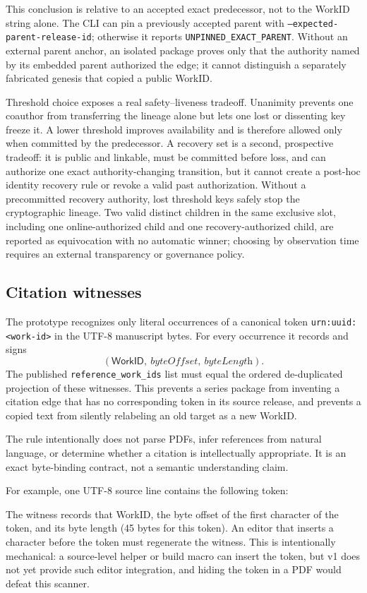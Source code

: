 \documentclass[acmsmall,screen,review,nonacm]{acmart}
\newcommand{\workid}{\textsf{WorkID}}
\begin{document}
This conclusion is relative to an accepted exact predecessor, not to the
WorkID string alone. The CLI can pin a previously accepted parent with
\texttt{--expected-parent-release-id}; otherwise it reports
\texttt{UNPINNED\_EXACT\_PARENT}. Without an external parent anchor, an isolated
package proves only that the authority named by its embedded parent authorized
the edge; it cannot distinguish a separately fabricated genesis that copied a
public WorkID.

Threshold choice exposes a real safety--liveness tradeoff. Unanimity prevents
one coauthor from transferring the lineage alone but lets one lost or dissenting
key freeze it. A lower threshold improves availability and is therefore allowed
only when committed by the predecessor. A recovery set is a second, prospective
tradeoff: it is public and linkable, must be committed before loss, and can
authorize one exact authority-changing transition, but it cannot create a
post-hoc identity recovery rule or revoke a valid past authorization. Without a
precommitted recovery authority, lost threshold keys safely stop the
cryptographic lineage. Two valid distinct children in the same exclusive slot,
including one online-authorized child and one recovery-authorized child, are
reported as equivocation with no automatic winner; choosing by observation time
requires an external transparency or governance policy.

\subsection{Citation witnesses}

The prototype recognizes only literal occurrences of a canonical token \texttt{urn:uuid:<work-id>} in the UTF-8 manuscript bytes. For every occurrence it records and signs
\[
  (\workid,\ \textit{byteOffset},\ \textit{byteLength}).
\]
The published \texttt{reference\_work\_ids} list must equal the ordered de-duplicated projection of these witnesses. This prevents a series package from inventing a citation edge that has no corresponding token in its source release, and prevents a copied text from silently relabeling an old target as a new \workid.

The rule intentionally does not parse PDFs, infer references from natural language, or determine whether a citation is intellectually appropriate. It is an exact byte-binding contract, not a semantic understanding claim.

For example, one UTF-8 source line contains the following token:
\begin{center}
\end{center}
The witness records that WorkID, the byte offset of the first character of the
token, and its byte length (45 bytes for this token). An editor that inserts a
character before the token must regenerate the witness. This is intentionally
mechanical: a source-level helper or build macro can insert the token, but v1
does not yet provide such editor integration, and hiding the token in a PDF
would defeat this scanner.
\end{document}
